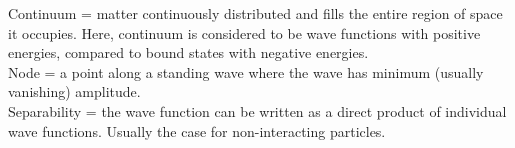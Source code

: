 \documentclass[landscape,a0paper,fontscale=0.31]{baposter} %
\begin{document}
\begin{poster}
{Continuum =  matter continuously distributed and fills the entire region of space it occupies. Here, continuum is considered to be wave functions with positive energies, compared to bound states with negative energies.\\

Node = a point along a standing wave where the wave has minimum (usually vanishing) amplitude.\\

Separability = the wave function can be written as a direct product of individual wave functions. Usually the case for non-interacting particles.

}


\end{poster}
\end{document}
